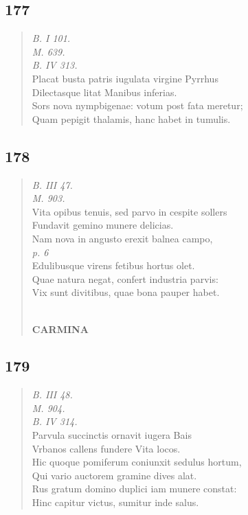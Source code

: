 \documentclass[11pt, a4paper]{report}
\begin{document}
            \subsection*{177}
      \begin{verse}
      \textit{B. I 101.} \\ \textit{M. 639.} \\ \textit{B. IV 313.} \\ Placat busta patris iugulata virgine Pyrrhus \\ Dilectasque litat Manibus inferias. \\ Sors nova nympbigenae: votum post fata meretur; \\ Quam pepigit thalamis, hanc habet in tumulis. \\ 
      \end{verse}
  
            \subsection*{178}
      \begin{verse}
      \textit{B. III 47.} \\ \textit{M. 903.} \\ Vita opibus tenuis, sed parvo in cespite sollers \\ Fundavit gemino munere delicias. \\ Nam nova in angusto erexit balnea campo, \\ \textit{p. 6} \\ Edulibusque virens fetibus hortus olet. \\ Quae natura negat, confert industria parvis: \\ Vix sunt divitibus, quae bona pauper habet. \\ 
        ﻿\pagebreak 
     \marginpar{[154]} \begin{center} \textbf{CARMINA} \end{center}
      \end{verse}
  
            \subsection*{179}
      \begin{verse}
      \textit{B. III 48.} \\ \textit{M. 904.} \\ \textit{B. IV 314.} \\ Parvula succinctis ornavit iugera Bais \\ Vrbanos callens fundere Vita locos. \\ Hic quoque pomiferum coniunxit sedulus hortum, \\ Qui vario auctorem gramine dives alat. \\ Rus gratum domino duplici iam munere constat: \\ Hinc capitur victus, sumitur inde salus. \\ 
      \end{verse}
  
\end{document}
